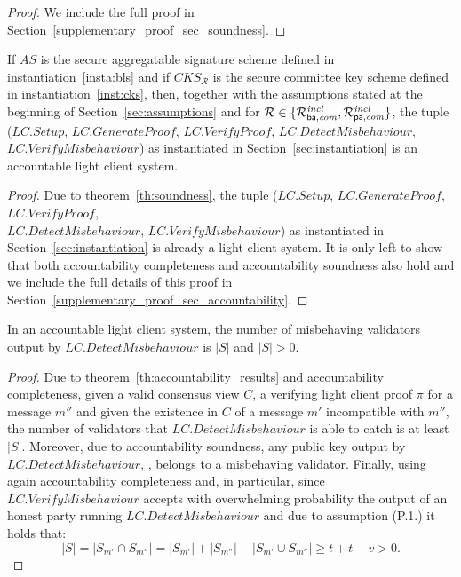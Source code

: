 \begin{proof} 
We include the full proof in Section~\ref{supplementary_proof_sec_soundness}.   
\end{proof}

\begin{theorem} 
\label{th:accountability_results}
If $\mathit{AS}$ is the secure aggregatable signature scheme defined in instantiation~\ref{insta:bls} and if 
$\mathit{CKS_{\mathcal{R}}}$ is the secure committee key scheme defined in instantiation~\ref{inst:cks}, then, together 
with the assumptions stated at the beginning of Section~\ref{sec:assumptions} and for $\mathcal{R} \in \{ \mathcal{R}^{\mathit{incl}}_{\mathsf{ba},\mathit{com}}, \mathcal{R}^{\mathit{incl}}_{\mathsf{pa},\mathit{com}} \}$, the tuple 
($\mathit{LC.Setup}$, $\mathit{LC.GenerateProof}$, $\mathit{LC.VerifyProof}$, $\mathit{LC.DetectMisbehaviour}$, 
$\mathit{LC.VerifyMisbehaviour}$) as instantiated in Section~\ref{sec:instantiation} is an accountable light client system.
\end{theorem}
\begin{proof}
\noindent Due to theorem~\ref{th:soundness}, the tuple 
($\mathit{LC.Setup}$, $\mathit{LC.GenerateProof}$, $\mathit{LC.VerifyProof}$, \\ $\mathit{LC.DetectMisbehaviour}$, 
$\mathit{LC.VerifyMisbehaviour}$) as instantiated in Section~\ref{sec:instantiation} is already a light client system. 
It is only left to show that both accountability completeness and accountability soundness also hold and we include the full details of this proof in 
Section~\ref{supplementary_proof_sec_accountability}.   
\end{proof}

\begin{corollary} In an accountable light client system, the number of misbehaving validators output by 
$\mathit{LC.DetectMisbehaviour}$ is $|S|$ and $|S| > 0$.
\end{corollary}
\begin{proof} Due to theorem~\ref{th:accountability_results} and accountability completeness, 
given a valid consensus view $C$, a verifying light client proof $\pi$ for a message $m''$ 
and given the existence in $C$ of a message $m'$ incompatible with $m''$, the number of 
validators that $\mathit{LC.DetectMisbehaviour}$ is able to catch is at least $|S|$. Moreover, due 
to accountability soundness, any public key output by $\mathit{LC.DetectMisbehaviour}$, \ewnp, belongs to a misbehaving validator. 
Finally, using again accountability completeness and, in particular, since $\mathit{LC.VerifyMisbehaviour}$ accepts 
with overwhelming probability the output of an honest party running $\mathit{LC.DetectMisbehaviour}$ and due to assumption (P.1.) it holds that:
$$ |S| = |S_{m'} \cap S_{m''}| = |S_{m'}| + |S_{m''}| - |S_{m'} \cup S_{m''}| \geq t + t - v > 0.$$ 
\end{proof}
